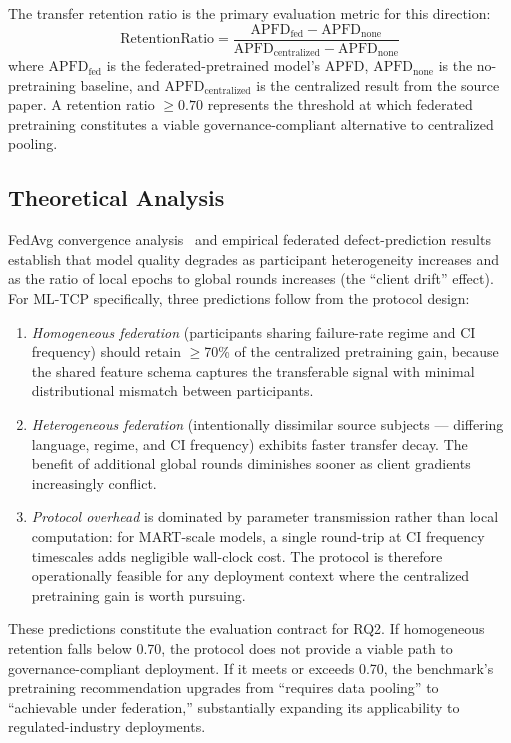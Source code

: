 \documentclass[conference]{IEEEtran}
\begin{document}
The transfer retention ratio is the primary evaluation metric for this direction:
\[
\mathrm{RetentionRatio} = \frac{\mathrm{APFD}_{\mathrm{fed}} - \mathrm{APFD}_{\mathrm{none}}}{\mathrm{APFD}_{\mathrm{centralized}} - \mathrm{APFD}_{\mathrm{none}}}
\]
where $\mathrm{APFD}_{\mathrm{fed}}$ is the federated-pretrained model's APFD, $\mathrm{APFD}_{\mathrm{none}}$ is the no-pretraining baseline, and $\mathrm{APFD}_{\mathrm{centralized}}$ is the centralized result from the source paper. A retention ratio $\geq 0.70$ represents the threshold at which federated pretraining constitutes a viable governance-compliant alternative to centralized pooling.

\subsection{Theoretical Analysis}

FedAvg convergence analysis~\cite{mcmahan2017} and empirical federated defect-prediction results establish that model quality degrades as participant heterogeneity increases and as the ratio of local epochs to global rounds increases (the ``client drift'' effect). For ML-TCP specifically, three predictions follow from the protocol design:

\begin{enumerate}[leftmargin=*]
\item \textit{Homogeneous federation} (participants sharing failure-rate regime and CI frequency) should retain $\geq$70\% of the centralized pretraining gain, because the shared feature schema captures the transferable signal with minimal distributional mismatch between participants.
\item \textit{Heterogeneous federation} (intentionally dissimilar source subjects — differing language, regime, and CI frequency) exhibits faster transfer decay. The benefit of additional global rounds diminishes sooner as client gradients increasingly conflict.
\item \textit{Protocol overhead} is dominated by parameter transmission rather than local computation: for MART-scale models, a single round-trip at CI frequency timescales adds negligible wall-clock cost. The protocol is therefore operationally feasible for any deployment context where the centralized pretraining gain is worth pursuing.
\end{enumerate}

These predictions constitute the evaluation contract for RQ2. If homogeneous retention falls below 0.70, the protocol does not provide a viable path to governance-compliant deployment. If it meets or exceeds 0.70, the benchmark's pretraining recommendation upgrades from ``requires data pooling'' to ``achievable under federation,'' substantially expanding its applicability to regulated-industry deployments.
\end{document}
